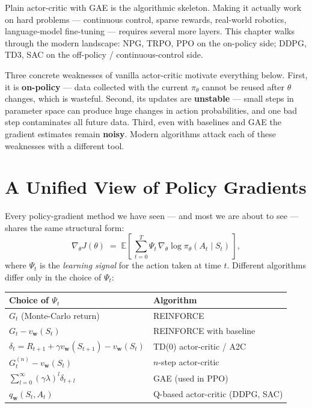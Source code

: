 \documentclass[11pt, oneside]{book}
\newcommand{\E}{\mathbb{E}}              %
\begin{document}
Plain actor-critic with GAE is the algorithmic skeleton.
Making it actually work on hard problems --- continuous control, sparse rewards,
real-world robotics, language-model fine-tuning --- requires several more layers.
This chapter walks through the modern landscape: NPG, TRPO, PPO on the on-policy side;
DDPG, TD3, SAC on the off-policy / continuous-control side.

Three concrete weaknesses of vanilla actor-critic motivate everything below.
First, it is \textbf{on-policy} --- data collected with the current $\pi_\theta$ cannot
be reused after $\theta$ changes, which is wasteful.
Second, its updates are \textbf{unstable} --- small steps in parameter space can produce
huge changes in action probabilities, and one bad step contaminates all future data.
Third, even with baselines and GAE the gradient estimates remain \textbf{noisy}.
Modern algorithms attack each of these weaknesses with a different tool.

\section{A Unified View of Policy Gradients}

Every policy-gradient method we have seen --- and most we are about to see ---
shares the same structural form:
\[
  \nabla_\theta J(\theta) \;=\; \E\!\left[\, \sum_{t=0}^{T} \Psi_t\, \nabla_\theta \log \pi_\theta(A_t \mid S_t)\, \right],
\]
where $\Psi_t$ is the \emph{learning signal} for the action taken at time $t$.
Different algorithms differ only in the choice of $\Psi_t$:

\begin{center}
\begin{tabular}{ll}
\toprule
\textbf{Choice of $\Psi_t$} & \textbf{Algorithm} \\
\midrule
$G_t$ (Monte-Carlo return)                                         & REINFORCE \\
$G_t - v_\mathbf{w}(S_t)$                                          & REINFORCE with baseline \\
$\delta_t = R_{t+1} + \gamma v_\mathbf{w}(S_{t+1}) - v_\mathbf{w}(S_t)$ & TD(0) actor-critic / A2C \\
$G_t^{(n)} - v_\mathbf{w}(S_t)$                                    & $n$-step actor-critic \\
$\sum_{l=0}^\infty (\gamma\lambda)^l \delta_{t+l}$                 & GAE (used in PPO) \\
$q_\mathbf{w}(S_t, A_t)$                                           & Q-based actor-critic (DDPG, SAC) \\
\bottomrule
\end{tabular}
\end{center}
\end{document}
